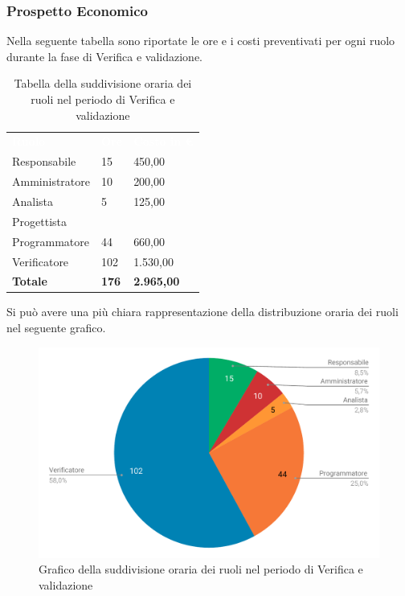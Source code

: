 \subsubsection{Prospetto Economico}
Nella seguente tabella sono riportate le ore e i costi preventivati per ogni ruolo durante la fase di Verifica e validazione.


\begin{table}[H]	
	\begin{center}
	    \begin{tabular}{C{4cm}C{1cm}C{3,5cm}}
			\textcolor{white}{\textbf{Ruolo}} & \textcolor{white}{\textbf{Ore}} & \textcolor{white}{\textbf{Costo in €}}
			\\
			Responsabile & 15 & 450,00 \\
			Amministratore & 10 & 200,00 \\
			Analista & 5 & 125,00 \\
			Progettista &  & \space \\
			Programmatore & 44 & 660,00 \\
			Verificatore & 102 & 1.530,00 \\
			\textbf{Totale} & \textbf{176} & \textbf{2.965,00} \\
		\end{tabular}
	    \caption{Tabella della suddivisione oraria dei ruoli nel periodo di Verifica e validazione} \label{tab:tabellaRuoliVerifica e validazione} 
	\end{center}
\end{table}


Si può avere una più chiara rappresentazione della distribuzione oraria dei ruoli nel seguente grafico.

\begin{figure}[H]
	\includegraphics[width=1\linewidth]{Preventivo/grafici/VV2.pdf}
	\caption{Grafico della suddivisione oraria dei ruoli nel periodo di Verifica e validazione}
\end{figure}

